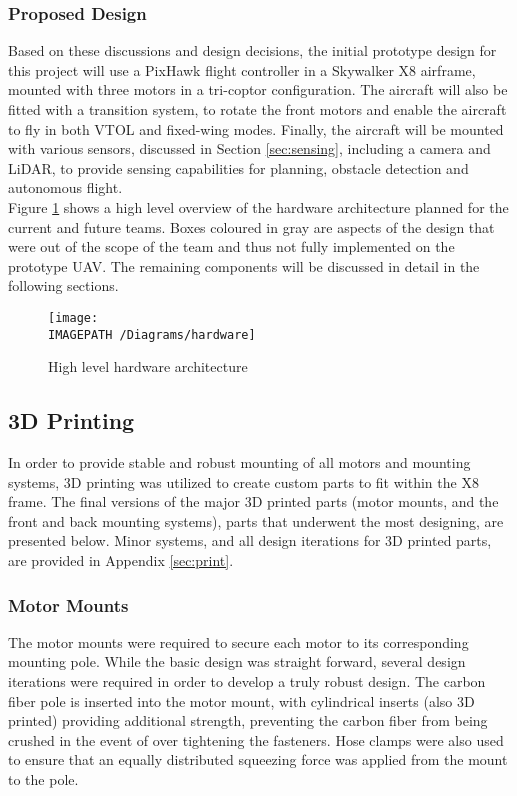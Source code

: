 \subsubsection*{Proposed Design}
Based on these discussions and design decisions, the initial prototype design for this project will use a PixHawk flight controller in a Skywalker X8 airframe, mounted with three motors in a tri-coptor configuration. The aircraft will also be fitted with a transition system, to rotate the front motors and enable the aircraft to fly in both VTOL and fixed-wing modes. Finally, the aircraft will be mounted with various sensors, discussed in Section \ref{sec:sensing}, including a camera and LiDAR, to provide sensing capabilities for planning, obstacle detection and autonomous flight.\\

Figure \ref{fig:hardwarearch} shows a high level overview of the hardware architecture planned for the current and future teams. Boxes coloured in gray are aspects of the design that were out of the scope of the \ID team and thus not fully implemented on the prototype UAV. The remaining components will be discussed in detail in the following sections.

\begin{figure}[!h]
	\centering
	\texttt{[image: \\IMAGEPATH /Diagrams/hardware]}
	\caption{High level hardware architecture}
	\label{fig:hardwarearch}
\end{figure}

\subsection{3D Printing}
In order to provide stable and robust mounting of all motors and mounting systems, 3D printing was utilized to create custom parts to fit within the X8 frame. The final versions of the major 3D printed parts (motor mounts, and the front and back mounting systems), parts that underwent the most designing, are presented below. Minor systems, and all design iterations for 3D printed parts, are provided in Appendix \ref{sec:print}.\\

\subsubsection*{Motor Mounts}
The motor mounts were required to secure each motor to its corresponding mounting pole. While the basic design was straight forward, several design iterations were required in order to develop a truly robust design. The carbon fiber pole is inserted into the motor mount, with cylindrical inserts (also 3D printed) providing additional strength, preventing the carbon fiber from being crushed in the event of over tightening the fasteners. Hose clamps were also used to ensure that an equally distributed squeezing force was applied from the mount to the pole.

